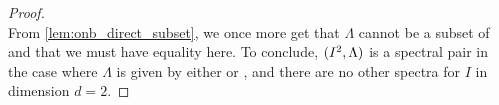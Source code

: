 \documentclass[../thesis.tex]{subfiles}
\begin{document}
\begin{proof}
\begin{equation*}
    \end{equation*} %
    From \cref{lem:onb_direct_subset}, we once more get that $\Lambda$ cannot be a subset of  and that we must have equality here. To conclude, $(I^2, \Lambda)$ is a spectral pair in the case where $\Lambda$ is given by either  or , and there are no other spectra for $I$ in dimension $d=2$.
\end{proof}
\end{document}
